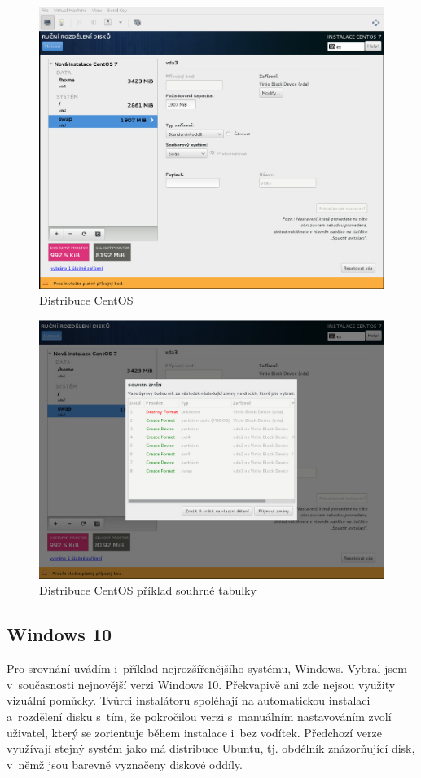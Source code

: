 \documentclass[a4paper,twosided]{article}
\begin{document}
\begin{figure}[hb]
\label{fig:centos1}
\caption{Distribuce CentOS}
\centering
\includegraphics[width=.8\columnwidth]{pics/centos1.jpg}
\end{figure}

\begin{figure}[hb]
\label{fig:centos2}
\caption{Distribuce CentOS příklad souhrné tabulky}
\centering
\includegraphics[width=.8\columnwidth]{pics/centos3.jpg}
\end{figure}

\subsection{Windows 10}

Pro srovnání uvádím i~příklad nejrozšířenějšího systému, Windows. Vybral jsem v~současnosti nejnovější verzi Windows 10. Překvapivě ani zde nejsou využity vizuální pomůcky.
Tvůrci instalátoru spoléhají na automatickou instalaci a~rozdělení disku s~tím, že pokročilou verzi s~manuálním nastavováním zvolí uživatel, který se zorientuje během instalace i~bez vodítek. Předchozí 
verze využívají stejný systém jako má distribuce Ubuntu, tj. obdélník znázorňující disk, v~němž jsou barevně vyznačeny diskové oddíly.
\end{document}
